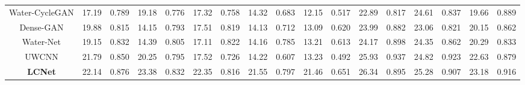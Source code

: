 \documentclass[journal]{IEEEtran}
\begin{document}
\begin{table}[htbp]
{\begin{tabular}{|c|cc|cc|cc|cc|cc|cc|cc|cc|}
Water-CycleGAN \cite{water-gan}               & 17.19                        & 0.789                        & 19.18                        & 0.776                        & 17.32                        & 0.758                        & 14.32                        & 0.683                        & 12.15                        & 0.517                        & 22.89                        & 0.817                        & 24.61                        & 0.837                        & 19.66                        & {\color[HTML]{3166FF} 0.889} \\
Dense-GAN \cite{dense-gan}                   & 19.88                        & 0.815                        & 14.15                        & 0.793                        & 17.51                        & {\color[HTML]{3166FF} 0.819} & 14.13                        & 0.712                        & 13.09                        & {\color[HTML]{3166FF} 0.620} & 23.99                        & 0.882                        & 23.06                        & 0.821                        & 20.15                        & 0.862                        \\
Water-Net \cite{water-net}                    & 19.15                        & 0.832                        & 14.39                        & {\color[HTML]{3166FF} 0.805} & 17.11                        & {\color[HTML]{FE0000} 0.822} & 14.16                        & {\color[HTML]{3166FF} 0.785} & 13.21                        & 0.613                        & 24.17                        & {\color[HTML]{3166FF} 0.898} & 24.35                        & 0.862                        & 20.29                        & 0.833                        \\
UWCNN \cite{uwcnn}                        & {\color[HTML]{3166FF} 21.79} & {\color[HTML]{3166FF} 0.850} & {\color[HTML]{3166FF} 20.25} & 0.795                        & {\color[HTML]{3166FF} 17.52} & 0.726                        & {\color[HTML]{3166FF} 14.22} & 0.607                        & {\color[HTML]{3166FF} 13.23} & 0.492                        & {\color[HTML]{3166FF} 25.93} & {\color[HTML]{FE0000} 0.937} & {\color[HTML]{3166FF} 24.82} & {\color[HTML]{FE0000} 0.923} & {\color[HTML]{3166FF} 22.63} & 0.879                        \\
\textbf{LCNet}                & {\color[HTML]{FE0000} 22.14} & {\color[HTML]{FE0000} 0.876} & {\color[HTML]{FE0000} 23.38} & {\color[HTML]{FE0000} 0.832} & {\color[HTML]{FE0000} 22.35} & 0.816                        & {\color[HTML]{FE0000} 21.55} & {\color[HTML]{FE0000} 0.797} & {\color[HTML]{FE0000} 21.46} & {\color[HTML]{FE0000} 0.651} & {\color[HTML]{FE0000} 26.34} & 0.895                        & {\color[HTML]{FE0000} 25.28} & {\color[HTML]{3166FF} 0.907} & {\color[HTML]{FE0000} 23.18} & {\color[HTML]{FE0000} 0.916} \\ \hline
\end{tabular}}
\label{tab1} 
\end{table}
\end{document}
